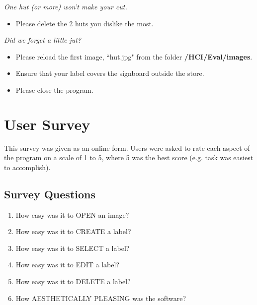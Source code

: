 \documentclass[11pt,twocolumn]{article}
\begin{document}
 \indent \indent \indent \indent \indent \indent  \indent \indent \indent  \indent \indent \indent \indent
\indent \indent \indent \indent \indent \indent \emph{One hut (or more) won’t make your cut.}
\begin{itemize}
\item Please delete the 2 huts you dislike the most.
\end{itemize}

 \indent \indent
\indent \indent \indent \indent \indent \indent  \indent \indent \indent  \indent \indent \indent \indent \indent \indent 
\indent  \indent \indent \indent \indent  \indent \indent \indent  \emph{Did we forget a little jut?}
\begin{itemize}
\item Please reload the first image, ``hut.jpg" from the folder {\bf /HCI/Eval/images}.
\item Ensure that your label covers the signboard outside the store.
\end{itemize}

\begin{itemize}
\item Please close the program.
\end{itemize}

\newpage
\section{User Survey}

This survey was given as an online form. Users were asked to rate each aspect of the program on a scale of 1 to 5, where 5 was the best score (e.g. task was easiest to accomplish). 

\subsection{Survey Questions}

\begin{enumerate}
\item How easy was it to OPEN an image? 
\item How easy was it to CREATE a label?
\item How easy was it to SELECT a label?
\item How easy was it to EDIT a label? 
\item How easy was it to DELETE a label?
\item How AESTHETICALLY PLEASING was the software?
\end{enumerate}
\end{document}
